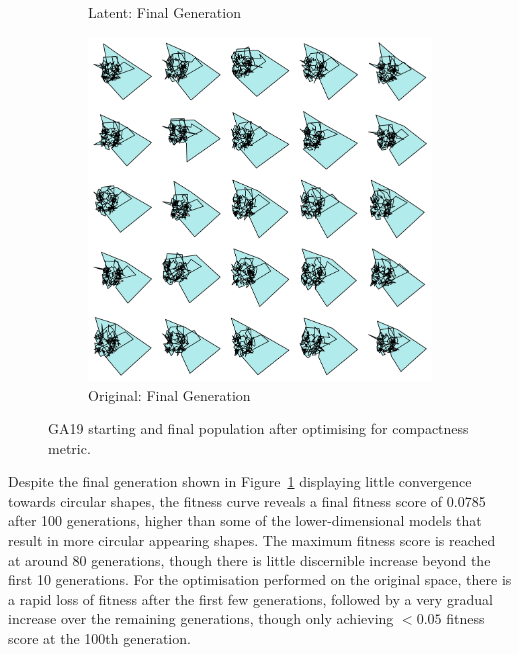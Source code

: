 \documentclass{article}
\begin{document}
\begin{figure}[H]
\begin{subfigure}[b]{0.32\textwidth}
        \caption{Latent: Final Generation}
        \label{fig:GA19_latent_final}
    \end{subfigure}
    \hfill
    \begin{subfigure}[b]{0.32\textwidth}
        \centering
        \includegraphics[width=\textwidth]{figures/GAResults/GA19/original/original_final_gen.png}
        \caption{Original: Final Generation}
        \label{fig:GA19_original_final}
    \end{subfigure}
    \caption{GA19 starting and final population after optimising for compactness metric.}
    \label{fig:GA19_before_after_GA}
\end{figure}

Despite the final generation shown in Figure~\ref{fig:GA19_latent_final} displaying little convergence towards circular shapes, the fitness curve reveals a final fitness score of 0.0785 after 100 generations, higher than some of the lower-dimensional models that result in more circular appearing shapes. The maximum fitness score is reached at around 80 generations, though there is little discernible increase beyond the first 10 generations. For the optimisation performed on the original space, there is a rapid loss of fitness after the first few generations, followed by a very gradual increase over the remaining generations, though only achieving $<0.05$ fitness score at the 100th generation.
\end{document}
